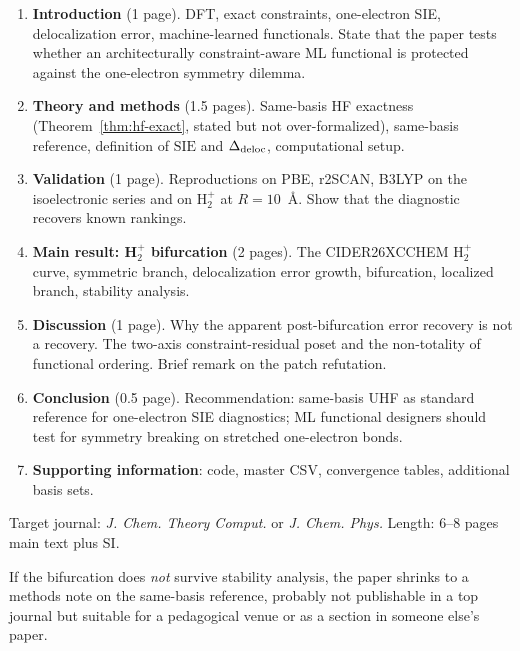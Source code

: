 \documentclass[11pt]{report}
\theoremstyle{definition}
\theoremstyle{remark}
\newcommand{\SIE}{\mathrm{SIE}}
\begin{document}
\begin{enumerate}
  \item \textbf{Introduction} (1 page). DFT, exact constraints,
        one-electron SIE, delocalization error, machine-learned
        functionals. State that the paper tests whether an
        architecturally constraint-aware ML functional is protected
        against the one-electron symmetry dilemma.

  \item \textbf{Theory and methods} (1.5 pages). Same-basis HF exactness
        (Theorem~\ref{thm:hf-exact}, stated but not over-formalized),
        same-basis reference, definition of $\SIE$ and $\Delta_{\rm
        deloc}$, computational setup.

  \item \textbf{Validation} (1 page). Reproductions on PBE, r2SCAN,
        B3LYP on the isoelectronic series and on H$_2^+$ at
        $R = 10$~\AA. Show that the diagnostic recovers known rankings.

  \item \textbf{Main result: H$_2^+$ bifurcation} (2 pages). The
        CIDER26XCCHEM H$_2^+$ curve, symmetric branch, delocalization
        error growth, bifurcation, localized branch, stability analysis.

  \item \textbf{Discussion} (1 page). Why the apparent post-bifurcation
        error recovery is not a recovery. The two-axis constraint-residual
        poset and the non-totality of functional ordering. Brief remark
        on the patch refutation.

  \item \textbf{Conclusion} (0.5 page). Recommendation: same-basis UHF
        as standard reference for one-electron SIE diagnostics; ML
        functional designers should test for symmetry breaking on
        stretched one-electron bonds.

  \item \textbf{Supporting information}: code, master CSV, convergence
        tables, additional basis sets.
\end{enumerate}

Target journal: \emph{J. Chem. Theory Comput.} or \emph{J. Chem. Phys.}
Length: 6--8 pages main text plus SI.

If the bifurcation does \emph{not} survive stability analysis, the paper
shrinks to a methods note on the same-basis reference, probably not
publishable in a top journal but suitable for a pedagogical venue or as
a section in someone else's paper.
\end{document}
